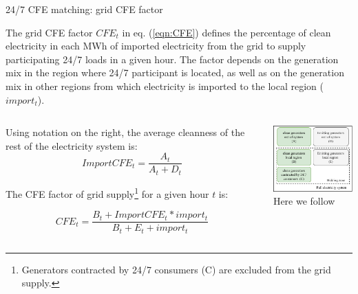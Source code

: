 \begin{frame}{24/7 CFE matching: grid CFE factor}

  {\footnotesize

  The \alert{grid CFE factor} $CFE_t$ in eq. (\ref{eqn:CFE}) defines the percentage of clean electricity in each MWh of imported electricity from the grid to supply participating 24/7 loads in a given hour. The factor depends on the generation mix in the region where 24/7 participant is located, as well as on the generation mix in other regions from which electricity is imported to the local region ($import_t$).

  \begin{columns}
    \begin{column}{8cm}
    Using notation on the right, the average cleanness of the rest of the electricity system is:   
  \begin{equation*}
  ImportCFE_t = \frac{A_t}{A_t + D_t}
  \end{equation*}

  The CFE factor of grid supply\footnote{\scriptsize{Generators contracted by 24/7 consumers (C) are excluded from the grid supply.}} for a given hour $t$ is:

  \begin{equation*}
  CFE_t = \frac{B_t + ImportCFE_t * import_t}{B_t + E_t + import_t}
  \end{equation*}    

  \end{column}
  \begin{column}{5cm}
  \centering
  \includegraphics[width=4.5cm]{images/cfe.png} \\
  \scriptsize{Here we follow }
  \end{column}
    
  \end{columns}
  \noindent{}
  }
  
\end{frame}



